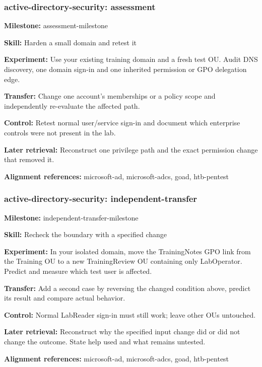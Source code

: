 \subsubsection{active-directory-security: assessment}
\noindent\textbf{Milestone:} assessment-milestone\par
\noindent\textbf{Skill:} Harden a small domain and retest it\par
\noindent\textbf{Experiment:} Use your existing training domain and a fresh test OU. Audit DNS discovery, one domain sign-in and one inherited permission or GPO delegation edge.\par
\noindent\textbf{Transfer:} Change one account's memberships or a policy scope and independently re-evaluate the affected path.\par
\noindent\textbf{Control:} Retest normal user/service sign-in and document which enterprise controls were not present in the lab.\par
\noindent\textbf{Later retrieval:} Reconstruct one privilege path and the exact permission change that removed it.\par
\noindent\textbf{Alignment references:} microsoft-ad, microsoft-adcs, goad, htb-pentest\par
\subsubsection{active-directory-security: independent-transfer}
\noindent\textbf{Milestone:} independent-transfer-milestone\par
\noindent\textbf{Skill:} Recheck the boundary with a specified change\par
\noindent\textbf{Experiment:} In your isolated domain, move the TrainingNotes GPO link from the Training OU to a new TrainingReview OU containing only LabOperator. Predict and measure which test user is affected.\par
\noindent\textbf{Transfer:} Add a second case by reversing the changed condition above, predict its result and compare actual behavior.\par
\noindent\textbf{Control:} Normal LabReader sign-in must still work; leave other OUs untouched.\par
\noindent\textbf{Later retrieval:} Reconstruct why the specified input change did or did not change the outcome. State help used and what remains untested.\par
\noindent\textbf{Alignment references:} microsoft-ad, microsoft-adcs, goad, htb-pentest\par
